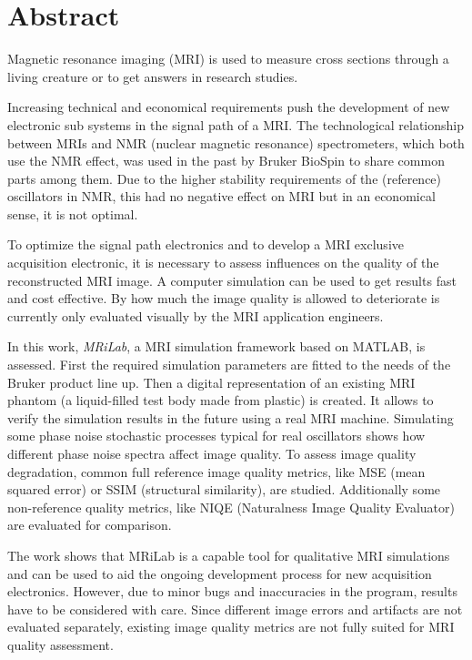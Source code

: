 \chapter*{Abstract}
Magnetic resonance imaging (MRI) is used to measure cross sections through a living creature or to get answers in research studies.

Increasing technical and economical requirements push the development of new electronic sub systems in the signal path of a MRI. The technological relationship between MRIs and NMR (nuclear magnetic resonance) spectrometers, which both use the NMR effect, was used in the past by Bruker BioSpin to share common parts among them.
Due to the higher stability requirements of the (reference) oscillators in NMR, this had no negative effect on MRI but in an economical sense, it is not optimal.

To optimize the signal path electronics and to develop a MRI exclusive acquisition electronic, it is necessary to assess influences on the quality of the reconstructed MRI image. A computer simulation can be used to get results fast and cost effective. By how much the image quality is allowed to deteriorate is currently only evaluated visually by the MRI application engineers.

In this work, \textit{MRiLab}, a MRI simulation framework based on MATLAB, is assessed. First the required simulation parameters are fitted to the needs of the Bruker product line up. Then a digital representation of an existing MRI phantom (a liquid-filled test body made from plastic) is created. It allows to verify the simulation results in the future using a real MRI machine.
Simulating some phase noise stochastic processes typical for real oscillators shows how different phase noise spectra affect image quality. To assess image quality degradation, common full reference image quality metrics, like MSE (mean squared error) or SSIM (structural similarity), are studied. Additionally some non-reference quality metrics, like NIQE (Naturalness Image Quality Evaluator) are evaluated for comparison.

The work shows that MRiLab is a capable tool for qualitative MRI simulations and can be used to aid the ongoing development process for new acquisition electronics. However, due to minor bugs and inaccuracies in the program, results have to be considered with care. Since different image errors and artifacts are not evaluated separately, existing image quality metrics are not fully suited for MRI quality assessment.

